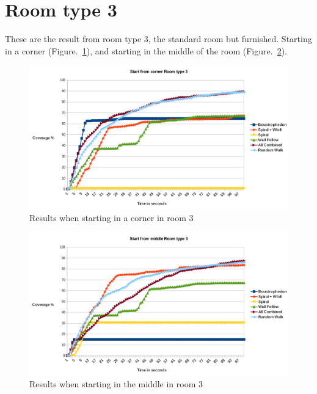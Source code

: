 \documentclass[bachelor]{kththesis}
\begin{document}
\section{Room type 3}
These are the result from room type 3, the standard room but furnished. Starting in a corner (Figure.~\ref{fig:corner3}), and starting in the middle of the room (Figure.~\ref{fig:middle3}).
\begin{figure}[H]
	\includegraphics[width=15cm]{img/cornerroom1furnchart.png}
	\centering
	\caption{Results when starting in a corner in room 3}
	\label{fig:corner3}
\end{figure}
\begin{figure}[H]
	\includegraphics[width=15cm]{img/middleroom1furnchart.png}
	\centering
	\caption{Results when starting in the middle in room 3}
	\label{fig:middle3}
\end{figure}
\end{document}

